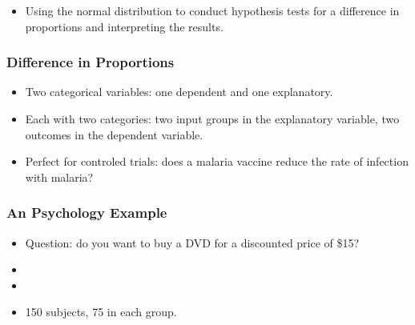 \documentclass{beamer}
\begin{document}
\begin{frame}
  \begin{itemize}
    \item[] 
      Using the normal distribution to conduct hypothesis tests for a
      difference in proportions and interpreting the results. 
  \end{itemize}
\end{frame}

\begin{frame}
  \frametitle{Difference in Proportions}
  \begin{itemize}
    \item[] 
      Two categorical variables: one dependent and one explanatory. 
      \vspace{0.5cm}
    \item[] 
      Each with two categories: two input groups in the explanatory
      variable, two outcomes in the dependent variable. 
      \vspace{0.5cm}
    \item[] 
      Perfect for controled trials: does a malaria vaccine reduce the
      rate of infection with malaria?
  \end{itemize}
\end{frame}

\begin{frame}
  \frametitle{An Psychology Example}
  \begin{itemize}
    \item[] 
      Question: do you want to buy a DVD for a discounted price of
      \$15? 
      \vspace{0.5cm}
    \item[] 
      \vspace{0.5cm}
    \item[] 
      \vspace{0.5cm}
    \item[] 
      150 subjects, 75 in each group. 
  \end{itemize}
\end{frame}
\end{document}
